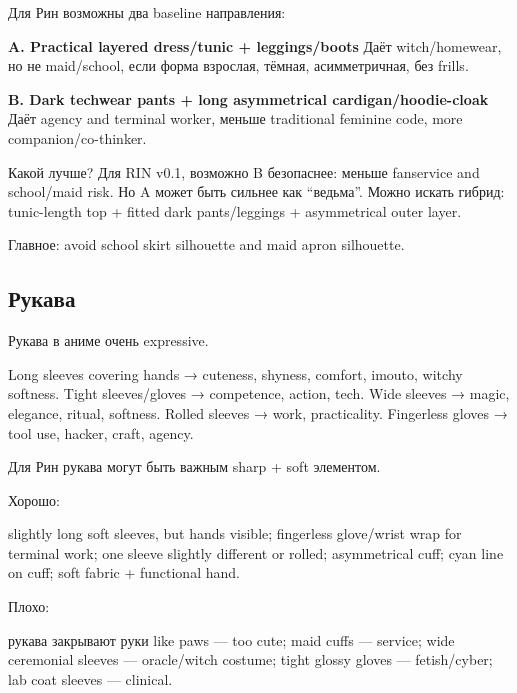 Для Рин возможны два baseline направления:

\textbf{A. Practical layered dress/\hspace{0pt}tunic + leggings/\hspace{0pt}boots} Даёт
witch/\hspace{0pt}homewear, но не maid/\hspace{0pt}school, если форма взрослая, тёмная,
асимметричная, без frills.

\textbf{B. Dark techwear pants + long asymmetrical
cardigan/\hspace{0pt}hoodie-cloak} Даёт agency and terminal worker, меньше
traditional feminine code, more companion/\hspace{0pt}co-thinker.

Какой лучше? Для RIN v0.1, возможно B безопаснее: меньше fanservice and
school/\hspace{0pt}maid risk. Но A может быть сильнее как ``ведьма''. Можно искать
гибрид: tunic-length top + fitted dark pants/\hspace{0pt}leggings + asymmetrical
outer layer.

Главное: avoid school skirt silhouette and maid apron silhouette.

\subsection*{Рукава}

Рукава в аниме очень expressive.

Long sleeves covering hands → cuteness, shyness, comfort, imouto, witchy
softness. Tight sleeves/\hspace{0pt}gloves → competence, action, tech. Wide sleeves
→ magic, elegance, ritual, softness. Rolled sleeves → work,
practicality. Fingerless gloves → tool use, hacker, craft, agency.

Для Рин рукава могут быть важным sharp + soft элементом.

Хорошо:

slightly long soft sleeves, but hands visible; fingerless glove/\hspace{0pt}wrist
wrap for terminal work; one sleeve slightly different or rolled;
asymmetrical cuff; cyan line on cuff; soft fabric + functional hand.

Плохо:

рукава закрывают руки like paws --- too cute; maid cuffs --- service;
wide ceremonial sleeves --- oracle/\hspace{0pt}witch costume; tight glossy gloves
--- fetish/\hspace{0pt}cyber; lab coat sleeves --- clinical.

